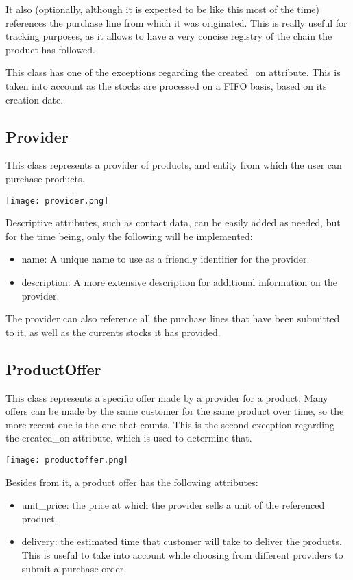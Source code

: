 It also (optionally, although it is expected to be like this most of the time) references the purchase line from which it was originated. This is really useful for tracking purposes, as it allows to have a very concise registry of the chain the product has followed.

This class has one of the exceptions regarding the created\_on attribute. This is taken into account as the stocks are processed on a FIFO basis, based on its creation date.

\subsection{Provider}
This class represents a provider of products, and entity from which the user can purchase products. 
\begin{center}
\texttt{[image: provider.png]}
\end{center}
Descriptive attributes, such as contact data, can be easily added as needed, but for the time being, only the following will be implemented:

\begin{itemize}
\item name: A unique name to use as a friendly identifier for the provider.
\item description: A more extensive description for additional information on the provider.
\end{itemize}

The provider can also reference all the purchase lines that have been submitted to it, as well as the currents stocks it has provided.

\subsection{ProductOffer}
This class represents a specific offer made by a provider for a product. Many offers can be made by the same customer for the same product over time, so the more recent one is the one that counts. This is the second exception regarding the created\_on attribute, which is used to determine that.
\begin{center}
\texttt{[image: productoffer.png]}
\end{center}
Besides from it, a product offer has the following attributes:

\begin{itemize}
\item unit\_price: the price at which the provider sells a unit of the referenced product.
\item delivery: the estimated time that customer will take to deliver the products. This is useful to take into account while choosing from different providers to submit a purchase order.
\end{itemize}

